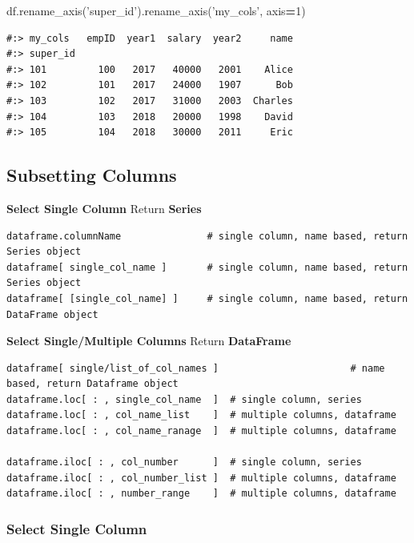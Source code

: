 \documentclass[
]{book}
\newenvironment{Shaded}{\begin{snugshade}}{\end{snugshade}}
\newcommand{\DecValTok}[1]{\textcolor[rgb]{0.06,0.06,0.06}{#1}}
\newcommand{\NormalTok}[1]{#1}
\newcommand{\OperatorTok}[1]{\textcolor[rgb]{0.43,0.43,0.43}{\textbf{#1}}}
\newcommand{\StringTok}[1]{\textcolor[rgb]{0.5,0.5,0.5}{#1}}
\begin{document}
\begin{Shaded}
\begin{Highlighting}[]
\NormalTok{df.rename_axis(}\StringTok{'super_id'}\NormalTok{).rename_axis(}\StringTok{'my_cols'}\NormalTok{, axis}\OperatorTok{=}\DecValTok{1}\NormalTok{)}
\end{Highlighting}
\end{Shaded}

\begin{verbatim}
#:> my_cols   empID  year1  salary  year2     name
#:> super_id                                      
#:> 101         100   2017   40000   2001    Alice
#:> 102         101   2017   24000   1907      Bob
#:> 103         102   2017   31000   2003  Charles
#:> 104         103   2018   20000   1998    David
#:> 105         104   2018   30000   2011     Eric
\end{verbatim}

\hypertarget{subsetting-columns}{%
\subsection{Subsetting Columns}\label{subsetting-columns}}

\textbf{Select Single Column} Return \textbf{Series}

\begin{verbatim}
dataframe.columnName               # single column, name based, return Series object
dataframe[ single_col_name ]       # single column, name based, return Series object
dataframe[ [single_col_name] ]     # single column, name based, return DataFrame object
\end{verbatim}

\textbf{Select Single/Multiple Columns} Return \textbf{DataFrame}

\begin{verbatim}
dataframe[ single/list_of_col_names ]                       # name based, return Dataframe object
dataframe.loc[ : , single_col_name  ]  # single column, series
dataframe.loc[ : , col_name_list    ]  # multiple columns, dataframe
dataframe.loc[ : , col_name_ranage  ]  # multiple columns, dataframe

dataframe.iloc[ : , col_number      ]  # single column, series
dataframe.iloc[ : , col_number_list ]  # multiple columns, dataframe
dataframe.iloc[ : , number_range    ]  # multiple columns, dataframe
\end{verbatim}

\hypertarget{select-single-column}{%
\subsubsection{Select Single Column}\label{select-single-column}}
\end{document}
